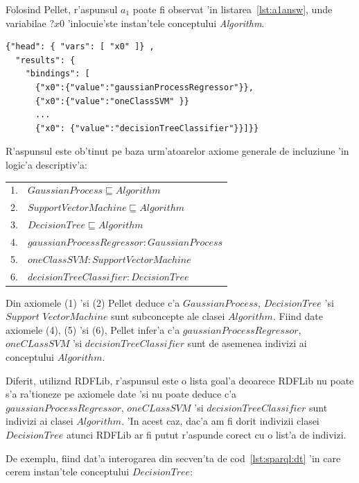 \documentclass[12pt,a4paper,twoside]{report}
\begin{document}
Folosind Pellet, r'aspunsul $a_1$ poate fi observat 'in listarea~\ref{lst:a1answ}, unde variabilae $?x0$ 'inlocuie'ste instan'tele conceptului {\it Algorithm}. 

\begin{center}
\begin{lstlisting}[basicstyle=\footnotesize, caption = R'aspunsul $a1$ la 'intrebarea $Q_1$, label=lst:a1answ]
{"head": { "vars": [ "x0" ]} ,
  "results": {
    "bindings": [
      {"x0":{"value":"gaussianProcessRegressor"}},
      {"x0":{"value":"oneClassSVM" }} 
      ...
      {"x0": {"value":"decisionTreeClassifier"}}]}}
\end{lstlisting}
\end{center}


R'aspunsul este ob'tinut pe baza urm'atoarelor axiome generale de incluziune 'in logic'a descriptiv'a:

\vspace*{0.3cm}
\begin{tabular}{ll}
1. & $GaussianProcess  \sqsubseteq Algorithm$\\
2. & $SupportVectorMachine  \sqsubseteq Algorithm$\\
3. & $DecisionTree  \sqsubseteq Algorithm$\\
4. & $gaussianProcessRegressor: GaussianProcess$\\
5. & $oneClassSVM: SupportVectorMachine$\\
6. & $decisionTreeClassifier: DecisionTree$\\
\end{tabular}
\vspace*{0.3cm}

Din axiomele (1) 'si (2) Pellet deduce c'a $GaussianProcess$, $DecisionTree$ 'si $Support$ $VectorMachine$ sunt subconcepte ale clasei $Algorithm$. Fiind date axiomele (4), (5) 'si (6), Pellet infer'a c'a $gaussianProcessRegressor$, $oneCLassSVM$ 'si $decisionTreeClassifier$ sunt de asemenea indivizi ai conceptului $Algorithm$. 

Diferit, utiliz\ia nd RDFLib, r'aspunsul este o lista goal'a deoarece RDFLib nu poate s'a ra'tioneze pe axiomele date 'si nu poate deduce c'a $gaussianProcessRegressor$, $oneCLassSVM$ 'si $decisionTreeClassifier$ sunt indivizi ai clasei $Algorithm$. 
'In acest caz, dac'a am fi dorit indivizii clasei $DecisionTree$ atunci RDFLib ar fi putut r'aspunde corect cu o list'a de indivizi.

De exemplu, fiind dat'a interogarea din secven'ta de cod~\ref{lst:sparql:dt} 'in care cerem instan'tele conceptului $DecisionTree$:
\end{document}
